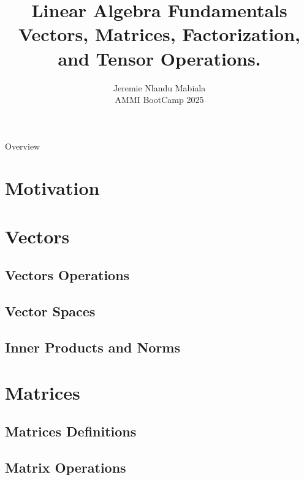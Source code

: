 \documentclass[11pt]{beamer}
\author[Jeremie N. Mabiala]{Jeremie Nlandu Mabiala \\
AMMI BootCamp 2025}
\title{Linear Algebra Fundamentals \\
\vspace*{.8cm}
Vectors, Matrices, Factorization, and Tensor Operations.}
\institute{African Masters of Machine Intelligence}
\begin{document}

\begin{frame}
    \titlepage
\end{frame}

\begin{frame}[allowframebreaks]{Overview}
    \tableofcontents
\end{frame}

\section{Motivation}


\section{Vectors}


\subsection{Vectors Operations}


\subsection{Vector Spaces}


\subsection{Inner Products and Norms}


\section{Matrices}
\subsection{Matrices Definitions}
  
\subsection{Matrix Operations}

\end{document}
